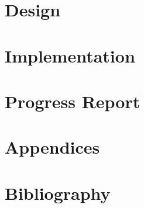 \documentclass[paper=a4, fontsize=11pt,twoside]{scrartcl}		%
\begin{document}

\section{Design}


\section{Implementation}


\section{Progress Report}




\section{Appendices}


\section{Bibliography}

\end{document}
